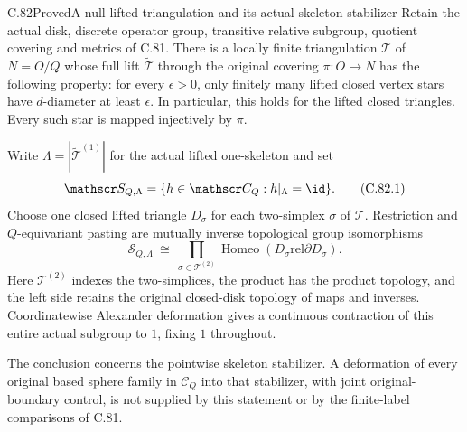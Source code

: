 \begin{claim}{C.82}{Proved}{A null lifted triangulation and its actual skeleton stabilizer}
Retain the actual disk, discrete operator group,
transitive relative subgroup, quotient covering and
metrics of C.81. There is a locally finite
triangulation $\mathcal T$ of $N=O/Q$ whose full
lift $\widetilde{\mathcal T}$ through the original
covering $\pi:O\to N$ has the following property:
for every $\epsilon>0$, only finitely many lifted
closed vertex stars have $d$-diameter at least
$\epsilon$. In particular, this holds for the
lifted closed triangles. Every such star is
mapped injectively by $\pi$.

Write $\Lambda=|\widetilde{\mathcal T}^{(1)}|$
for the actual lifted one-skeleton and set
\[
 \mathscr S_{Q,\Lambda}
   =\{h\in\mathscr C_Q:h|_\Lambda=\id\}.
                                                               \tag{C.82.1}
\]
Choose one closed lifted triangle $D_\sigma$
for each two-simplex $\sigma$ of $\mathcal T$.
Restriction and $Q$-equivariant pasting are
mutually inverse topological group isomorphisms
\[
 \mathscr S_{Q,\Lambda}
    \ \cong\ 
 \prod_{\sigma\in\mathcal T^{(2)}}
       \operatorname{Homeo}(D_\sigma\mathbin{\mathrm{rel}}
                                      \partial D_\sigma).
                                                               \tag{C.82.2}
\]
Here $\mathcal T^{(2)}$ indexes the two-simplices,
the product has the product topology, and the
left side retains the original closed-disk
topology of maps and inverses. Coordinatewise
Alexander deformation gives a continuous
contraction of this entire actual subgroup to
$1$, fixing $1$ throughout.

The conclusion concerns the pointwise skeleton
stabilizer. A deformation of every original
based sphere family in $\mathscr C_Q$ into that
stabilizer, with joint original-boundary control,
is not supplied by this statement or by the
finite-label comparisons of C.81.
\end{claim}

